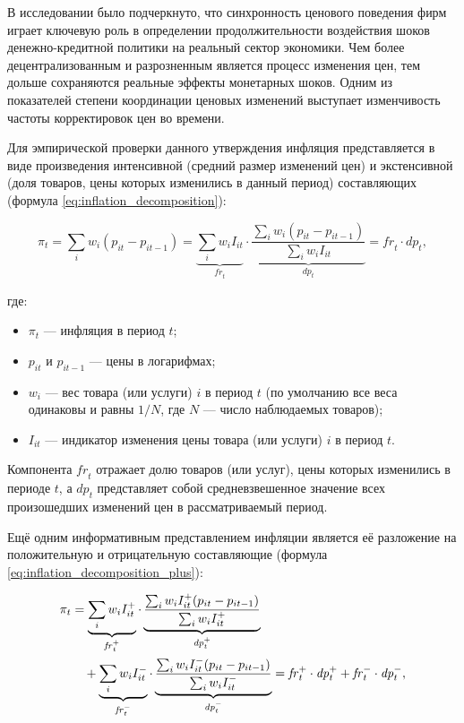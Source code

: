 В исследовании \cite{Taylor1980} было подчеркнуто, что синхронность ценового поведения фирм играет ключевую роль в определении продолжительности воздействия шоков денежно-кредитной политики на реальный сектор экономики. Чем более децентрализованным и разрозненным является процесс изменения цен, тем дольше сохраняются реальные эффекты монетарных шоков. Одним из показателей степени координации ценовых изменений выступает изменчивость частоты корректировок цен во времени. 

Для эмпирической проверки данного утверждения инфляция представляется в виде произведения интенсивной (средний размер изменений цен) и экстенсивной (доля товаров, цены которых изменились в данный период) составляющих \cite{KlenowKryvtsov2008} (формула \eqref{eq:inflation_decomposition}):

\begin{equation}
	\pi_t = \sum_{i} w_i (p_{it} - p_{it-1}) 
	= \underbrace{\sum_{i} w_i I_{it}}_{\mathit{fr}_t}
	\cdot 
	\underbrace{\frac{\sum_{i} w_i (p_{it} - p_{it-1})}{\sum_{i} w_i I_{it}}}_{\mathit{dp}_t}
	= \mathit{fr}_t \cdot \mathit{dp}_t,
	\label{eq:inflation_decomposition}
\end{equation}

где:
\begin{itemize}
	\item $\pi_t$ — инфляция в период $t$;
	\item $p_{it}$ и $p_{it-1}$ — цены в логарифмах;
	\item $w_i$ — вес товара (или услуги) $i$ в период $t$ (по умолчанию все веса одинаковы и равны $1/N$, где $N$ — число наблюдаемых товаров);
	\item $I_{it}$ — индикатор изменения цены товара (или услуги) $i$ в период $t$.
\end{itemize}

Компонента $\mathit{fr}_t$ отражает долю товаров (или услуг), цены которых изменились в периоде $t$, а $\mathit{dp}_t$ представляет собой средневзвешенное значение всех произошедших изменений цен в рассматриваемый период.

Ещё одним информативным представлением инфляции является её разложение на положительную и отрицательную составляющие \cite{KlenowKryvtsov2008} (формула \eqref{eq:inflation_decomposition_plus}):

\begin{align}
	\pi_t &= \underbrace{\sum_{i} w_i I_{it}^+}_{\mathit{fr}_t^+}
	\cdot 
	\underbrace{\frac{\sum_{i} w_i I_{it}^{+}(p_{it} - p_{it-1})}{\sum_{i} w_i I_{it}^+}}_{\mathit{dp}_t^+}
	\notag \\
	&\quad +
	\underbrace{\sum_{i} w_i I_{it}^-}_{\mathit{fr}_t^-}
	\cdot 
	\underbrace{\frac{\sum_{i} w_i I_{it}^{-}(p_{it} - p_{it-1})}{\sum_{i} w_i I_{it}^-}}_{\mathit{dp}_t^-}
	= \mathit{fr}_t^+ \cdot \mathit{dp}_t^+ + \mathit{fr}_t^- \cdot \mathit{dp}_t^-,
	\label{eq:inflation_decomposition_plus}
\end{align}


